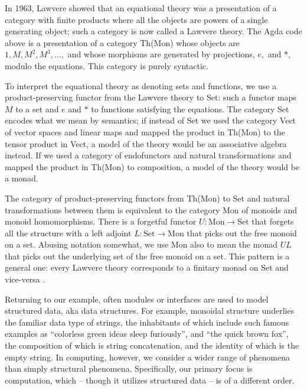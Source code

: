 \documentclass{llncs}
\newcommand{\maps}{\colon}
\newcommand{\Set}{\mathrm{Set}}
\newcommand{\Mon}{\mathrm{Mon}}
\begin{document}
  In 1963, Lawvere \cite{Lawvere} showed that an equational theory was
  a presentation of a category with finite products where all the
  objects are powers of a single generating object; such a category is
  now called a Lawvere theory.  The Agda code above is a presentation
  of a category Th(Mon) whose objects are $1, M, M^2, M^3, \ldots,$
  and whose morphisms are generated by projections, $e,$ and $*,$
  modulo the equations.  This category is purely syntactic.

  To interpret the equational theory as denoting sets and functions,
  we use a product-preserving functor from the Lawvere theory to Set:
  such a functor maps $M$ to a set and $e$ and $*$ to functions
  satisfying the equations.  The category Set encodes what we mean by
  semantics; if instead of Set we used the category Vect of vector
  spaces and linear maps and mapped the product in Th(Mon) to the
  tensor product in Vect, a model of the theory would be an
  associative algebra instead.  If we used a category of endofunctors
  and natural transformations and mapped the product in Th(Mon) to
  composition, a model of the theory would be a monad.

  The category of product-preserving functors from Th(Mon) to Set and
  natural transformations between them is equivalent to the category
  Mon of monoids and monoid homomorphisms.  There is a forgetful
  functor $U\maps \Mon \to \Set$ that forgets all the structure with a
  left adjoint $L\maps \Set \to \Mon$ that picks out the free monoid
  on a set.  Abusing notation somewhat, we use Mon also to mean the
  monad $UL$ that picks out the underlying set of the free monoid on a
  set.  This pattern is a general one: every Lawvere theory
  corresponds to a finitary monad on Set and vice-versa
  \cite{DBLP:journals/entcs/HylandP07}.

  Returning to our example, often modules or interfaces are used to
  model structured data, aka data structures. For example, monoidal
  structure underlies the familiar data type of strings, the
  inhabitants of which include such famous examples as ``colorless
  green ideas sleep furiously'', and ``the quick brown fox'', the
  composition of which is string concatenation, and the identity of
  which is the empty string. In computing, however, we consider a
  wider range of phenomena than simply structural
  phenomena. Specifically, our primary focus is computation, which --
  though it utilizes structured data -- is of a different order.
\end{document}
